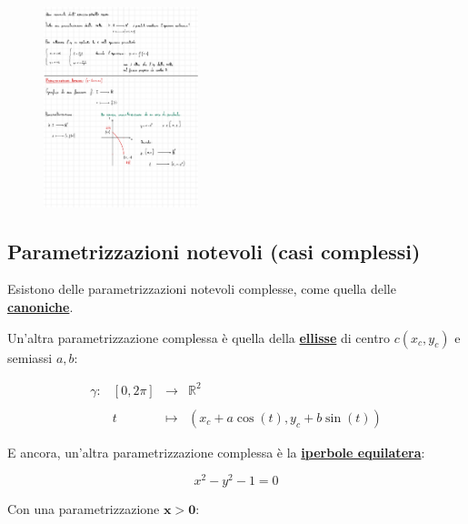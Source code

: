 \documentclass[a4paper]{article}
\begin{document}
	\begin{figure}[!htp]
		\centering
		\includegraphics[width=0.4\textwidth]{img/parametrizzazioni_notevoli_parabola}
	\end{figure}

	\newpage
	
	\subsection{Parametrizzazioni notevoli (casi complessi)}
	
	Esistono delle parametrizzazioni notevoli complesse, come quella delle \textcolor{Red3}{\textbf{\underline{canoniche}}}.\newline
	
	\noindent
	Un'altra parametrizzazione complessa è quella della \textcolor{Red3}{\textbf{\underline{ellisse}}} di centro $c\left(x_{c}, y_{c}\right)$ e semiassi $a,b$:
	
	\begin{equation*}
		\begin{array}{llll}
			\gamma: & \left[0,2\pi\right] & \longrightarrow & \mathbb{R}^{2} \\
			&&& \\
					& t					  & \longmapsto		& \left(x_{c} + a \cos\left(t\right), y_{c} + b \sin\left(t\right)\right)
		\end{array}
	\end{equation*}

	\noindent
	E ancora, un'altra parametrizzazione complessa è la \textcolor{Red3}{\textbf{\underline{iperbole equilatera}}}:
	
	\begin{equation*}
		x^{2} - y^{2} - 1 = 0
	\end{equation*}

	\noindent
	Con una parametrizzazione $\boldsymbol{x > 0}$:
	
\end{document}
